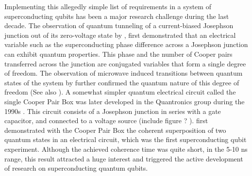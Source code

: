 Implementing this allegedly simple list of requirements in a system of superconducting qubits has been a major research challenge during the last decade.  The observation of  quantum tunneling of a current-biased Josephson junction out of its zero-voltage state by \cite{devoret_measurements_1985,martinis_energy-level_1985}, first  demonstrated  that an electrical variable such as the superconducting phase difference across a Josephson junction can exhibit quantum properties. This phase and the number of Cooper pairs transferred across the junction are conjugated variables that form a single degree of freedom.  The observation of microwave induced transitions between quantum states of the system by \cite{ martinis_energy-level_1985} further confirmed the quantum nature of this  degree of freedom (See also \cite{martinis_energy-level_1985,martinis_experimental_1987,clarke_quantum_1988}). A somewhat simpler quantum electrical circuit called the single Cooper Pair Box was later developed in the Quantronics  group during the 1990s \citep{bouchiat_quantum_1998}. This circuit consists of  a Josephson junction in series with a gate capacitor,  and connected to a voltage source (include figure ? ). \cite{nakamura_coherent_1999} first demonstrated with the Cooper Pair Box the   coherent superposition of two quantum states in an electrical circuit, which was the first superconducting qubit experiment.  Although the achieved coherence time was  quite short, in the 5-10 ns range,  this result attracted a huge interest   and triggered the active development of   research   on superconducting quantum qubits.  
